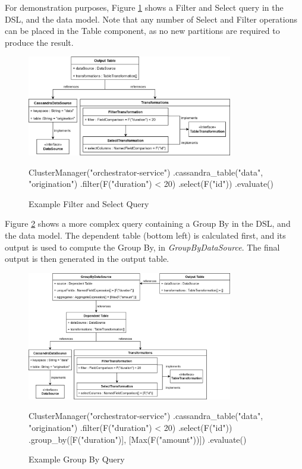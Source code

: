 For demonstration purposes, Figure \ref{fig:filter-select-query} shows a Filter and Select query in the DSL, and the data model. Note that any number of Select and Filter operations can be placed in the Table component, as no new partitions are required to produce the result.

\begin{figure}[htp]
	\centering
	\includegraphics[width=0.8\textwidth]{chapters/diagrams/implementation/filter-select-query}
	\begin{python}
ClusterManager("orchestrator-service")
.cassandra_table("data", "origination")
.filter(F("duration") < 20)
.select(F("id"))
.evaluate()
	\end{python}
	\caption{Example Filter and Select Query}
	\label{fig:filter-select-query}
\end{figure}


Figure \ref{fig:group-by-query} shows a more complex query containing a Group By in the DSL, and the data model. The dependent table (bottom left) is calculated first, and its output is used to compute the Group By, in \textit{GroupByDataSource}. The final output is then generated in the output table.

\begin{figure}[htp]
	\centering
	\includegraphics[width=0.8\textwidth]{chapters/diagrams/implementation/group-by-query}
	\linebreak
	\begin{python}
ClusterManager("orchestrator-service")
.cassandra_table("data", "origination")
.filter(F("duration") < 20)
.select(F("id"))
.group_by([F("duration")], [Max(F("amount"))])
.evaluate()
	\end{python}
	\caption{Example Group By Query}
	\label{fig:group-by-query}
\end{figure}

